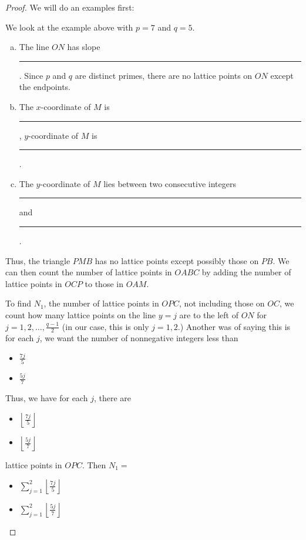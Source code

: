 \documentclass[letterpaper, 11 pt]{article}
\begin{document}
\begin{proof}
We will do an examples first:

\begin{example}
 We look at the example above with $p=7$ and $q=5$.  
\begin{enumerate}[a)]
 \item The line $ON$ has slope \rule{1cm}{0.4pt}. Since $p$ and $q$ are distinct primes, there are no lattice points on $ON$ except the endpoints. 
 \item The $x$-coordinate of $M$ is \rule{1cm}{0.4pt}, $y$-coordinate of $M$ is\rule{1cm}{0.4pt}.
 \item The $y$-coordinate of $M$ lies between two consecutive integers \rule{1cm}{0.4pt} and \rule{1cm}{0.4pt}.
\end{enumerate}

Thus, the triangle $PMB$ has no lattice points except possibly those on $PB$. We can then count the number of lattice points in $OABC$ by adding the number of lattice points in $OCP$ to those in $OAM$.

To find $N_1$, the number of lattice points in $OPC$, not including those on $OC$, we count how many lattice points on the line $y=j$ are to the left of $ON$ for $j=1,2,\dots,\frac{q-1}{2}$ (in our case, this is only $j=1,2$.) Another was of saying this is for each $j$, we want the number of nonnegative integers less than 
\begin{poll} \begin{itemize}
 \item  {$\frac{7j}{5}$}
 \item {$\frac{5j}{7}$}
\end{itemize} \end{poll}

 Thus, we have for each $j$, there are 
 \begin{poll} \begin{itemize}
 \item {$\left\lfloor\frac{7j}{5}\right\rfloor$}
 \item {$\left\lfloor\frac{5j}{7}\right\rfloor$}
\end{itemize} \end{poll}
 
lattice points in $OPC$. Then $N_1=$
 \begin{poll} \begin{itemize}
 \item  {$\sum_{j=1}^{2
}\left\lfloor\frac{7j}{5}\right\rfloor$}
 \item {$\sum_{j=1}^{2
}\left\lfloor\frac{5j}{7}\right\rfloor$}
\end{itemize} \end{poll}


\end{example}
\end{proof}
\end{document}
